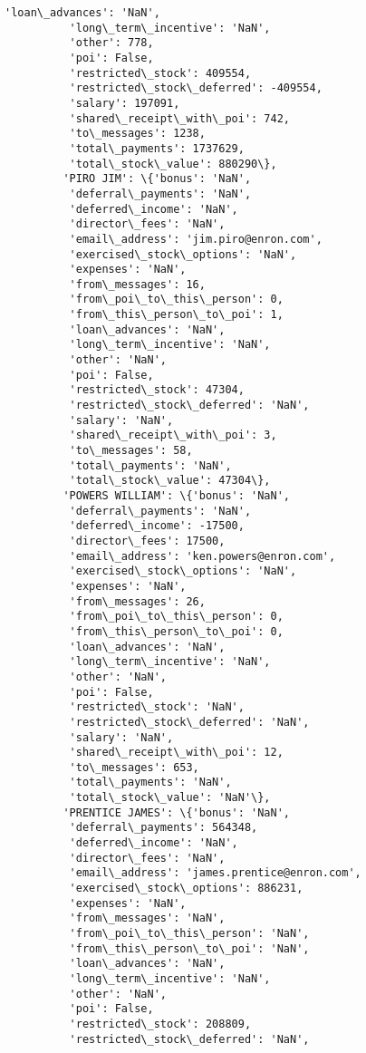 \documentclass[11pt]{article}
\begin{document}
\begin{Verbatim}[commandchars=\\\{\}]
          'loan\_advances': 'NaN',
          'long\_term\_incentive': 'NaN',
          'other': 778,
          'poi': False,
          'restricted\_stock': 409554,
          'restricted\_stock\_deferred': -409554,
          'salary': 197091,
          'shared\_receipt\_with\_poi': 742,
          'to\_messages': 1238,
          'total\_payments': 1737629,
          'total\_stock\_value': 880290\},
         'PIRO JIM': \{'bonus': 'NaN',
          'deferral\_payments': 'NaN',
          'deferred\_income': 'NaN',
          'director\_fees': 'NaN',
          'email\_address': 'jim.piro@enron.com',
          'exercised\_stock\_options': 'NaN',
          'expenses': 'NaN',
          'from\_messages': 16,
          'from\_poi\_to\_this\_person': 0,
          'from\_this\_person\_to\_poi': 1,
          'loan\_advances': 'NaN',
          'long\_term\_incentive': 'NaN',
          'other': 'NaN',
          'poi': False,
          'restricted\_stock': 47304,
          'restricted\_stock\_deferred': 'NaN',
          'salary': 'NaN',
          'shared\_receipt\_with\_poi': 3,
          'to\_messages': 58,
          'total\_payments': 'NaN',
          'total\_stock\_value': 47304\},
         'POWERS WILLIAM': \{'bonus': 'NaN',
          'deferral\_payments': 'NaN',
          'deferred\_income': -17500,
          'director\_fees': 17500,
          'email\_address': 'ken.powers@enron.com',
          'exercised\_stock\_options': 'NaN',
          'expenses': 'NaN',
          'from\_messages': 26,
          'from\_poi\_to\_this\_person': 0,
          'from\_this\_person\_to\_poi': 0,
          'loan\_advances': 'NaN',
          'long\_term\_incentive': 'NaN',
          'other': 'NaN',
          'poi': False,
          'restricted\_stock': 'NaN',
          'restricted\_stock\_deferred': 'NaN',
          'salary': 'NaN',
          'shared\_receipt\_with\_poi': 12,
          'to\_messages': 653,
          'total\_payments': 'NaN',
          'total\_stock\_value': 'NaN'\},
         'PRENTICE JAMES': \{'bonus': 'NaN',
          'deferral\_payments': 564348,
          'deferred\_income': 'NaN',
          'director\_fees': 'NaN',
          'email\_address': 'james.prentice@enron.com',
          'exercised\_stock\_options': 886231,
          'expenses': 'NaN',
          'from\_messages': 'NaN',
          'from\_poi\_to\_this\_person': 'NaN',
          'from\_this\_person\_to\_poi': 'NaN',
          'loan\_advances': 'NaN',
          'long\_term\_incentive': 'NaN',
          'other': 'NaN',
          'poi': False,
          'restricted\_stock': 208809,
          'restricted\_stock\_deferred': 'NaN',

\end{Verbatim}
\end{document}
